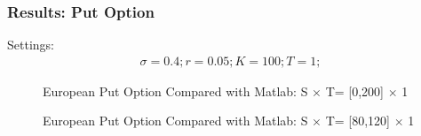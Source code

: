 \documentclass[blue]{beamer}
\begin{document}
\begin{frame}
\frametitle{Results: Put Option}
Settings:
\begin{align*}
\sigma = 0.4;
r = 0.05;
K = 100;
T = 1;
\end{align*}
\centering
\begin{figure}[H]
	\centering
	\begin{minipage}[t]{.45\linewidth}
		\caption{European Put Option Compared with Matlab: S $\times $ T= [0,200] $\times $ {1}}
	\end{minipage}
	\begin{minipage}[t]{.45\linewidth}
		\caption{European Put Option Compared with Matlab: S $\times $ T= [80,120] $\times $ {1}}
	\end{minipage}	
\end{figure}
\end{frame}
\end{document}
